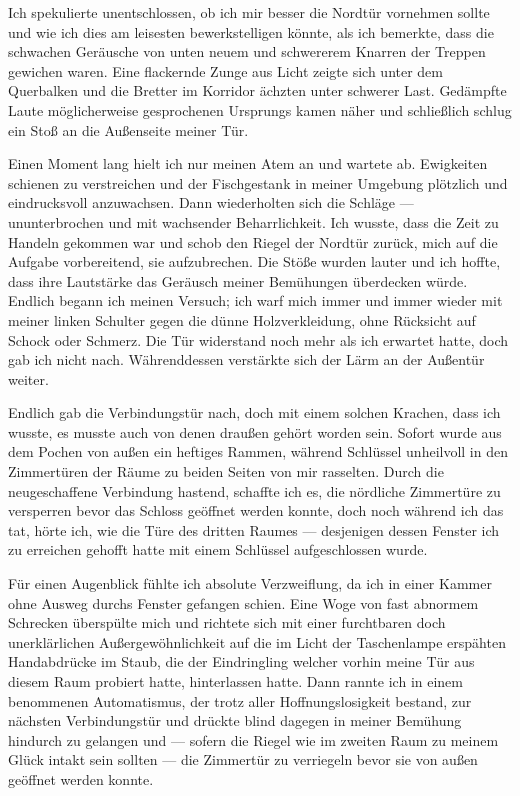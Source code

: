 Ich spekulierte unentschlossen, ob ich mir besser die Nordtür vornehmen sollte und wie ich dies am leisesten bewerkstelligen könnte, als ich bemerkte, dass die schwachen Geräusche von unten neuem und schwererem Knarren der Treppen gewichen waren. Eine flackernde Zunge aus Licht zeigte sich unter dem Querbalken und die Bretter im Korridor ächzten unter schwerer Last. Gedämpfte Laute möglicherweise gesprochenen Ursprungs kamen näher und schließlich schlug ein Stoß an die Außenseite meiner Tür.

Einen Moment lang hielt ich nur meinen Atem an und wartete ab. Ewigkeiten schienen zu verstreichen und der Fischgestank in meiner Umgebung plötzlich und eindrucksvoll anzuwachsen. Dann wiederholten sich die Schläge --- ununterbrochen und mit wachsender Beharrlichkeit. Ich wusste, dass die Zeit zu Handeln gekommen war und schob den Riegel der Nordtür zurück, mich auf die Aufgabe vorbereitend, sie aufzubrechen. Die Stöße wurden lauter und ich hoffte, dass ihre Lautstärke das Geräusch meiner Bemühungen überdecken würde. Endlich begann ich meinen Versuch; ich warf mich immer und immer wieder mit meiner linken Schulter gegen die dünne Holzverkleidung, ohne Rücksicht auf Schock oder Schmerz. Die Tür widerstand noch mehr als ich erwartet hatte, doch gab ich nicht nach. Währenddessen verstärkte sich der Lärm an der Außentür weiter.

Endlich gab die Verbindungstür nach, doch mit einem solchen Krachen, dass ich wusste, es musste auch von denen draußen gehört worden sein. Sofort wurde aus dem Pochen von außen ein heftiges Rammen, während Schlüssel unheilvoll in den Zimmertüren der Räume zu beiden Seiten von mir rasselten. Durch die neugeschaffene Verbindung hastend, schaffte ich es, die nördliche Zimmertüre zu versperren bevor das Schloss geöffnet werden konnte, doch noch während ich das tat, hörte ich, wie die Türe des dritten Raumes --- desjenigen dessen Fenster ich zu erreichen gehofft hatte mit einem Schlüssel aufgeschlossen wurde.

Für einen Augenblick fühlte ich absolute Verzweiflung, da ich in einer Kammer ohne Ausweg durchs Fenster gefangen schien. Eine Woge von fast abnormem Schrecken überspülte mich und richtete sich mit einer furchtbaren doch unerklärlichen Außergewöhnlichkeit auf die im Licht der Taschenlampe erspähten Handabdrücke im Staub, die der Eindringling welcher vorhin meine Tür aus diesem Raum probiert hatte, hinterlassen hatte. Dann rannte ich in einem benommenen Automatismus, der trotz aller Hoffnungslosigkeit bestand, zur nächsten Verbindungstür und drückte blind dagegen in meiner Bemühung hindurch zu gelangen und --- sofern die Riegel wie im zweiten Raum zu meinem Glück intakt sein sollten --- die Zimmertür zu verriegeln bevor sie von außen geöffnet werden konnte.

